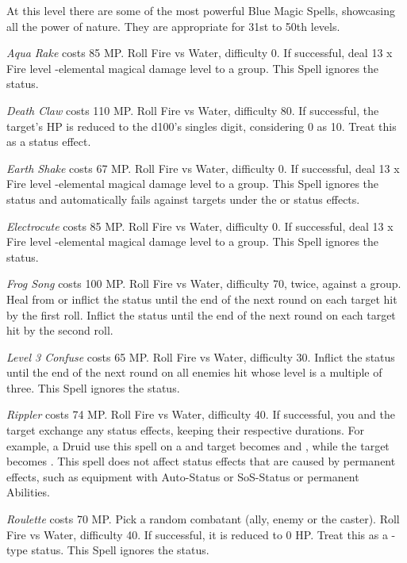 \begin{multicols}{2}
	At this level there are some of the most powerful Blue Magic Spells, showcasing all the power of nature. They are appropriate for 31st to 50th levels.

    \textit{Aqua Rake} costs 85 MP\@. Roll Fire vs Water, difficulty 0. If successful, deal 13 x Fire level -elemental magical damage level to a group. This Spell ignores the  status.

    \textit{Death Claw} costs 110 MP\@. Roll Fire vs Water, difficulty 80. If successful, the target's HP is reduced to the d100’s singles digit, considering 0 as 10. Treat this as a  status effect.
    
    \textit{Earth Shake} costs 67 MP\@. Roll Fire vs Water, difficulty 0. If successful, deal 13 x Fire level -elemental magical damage level to a group. This Spell ignores the  status and automatically fails against targets under the  or  status effects.
    
    \textit{Electrocute} costs 85 MP\@. Roll Fire vs Water, difficulty 0. If successful, deal 13 x Fire level -elemental magical damage level to a group. This Spell ignores the  status.
    
    \textit{Frog Song} costs 100 MP\@. Roll Fire vs Water, difficulty 70, twice, against a group. Heal from or inflict the  status until the end of the next round on each target hit by the first roll. Inflict the  status until the end of the next round on each target hit by the second roll.
    
    \textit{Level 3 Confuse} costs 65 MP\@. Roll Fire vs Water, difficulty 30. Inflict the  status until the end of the next round on all enemies hit whose level is a multiple of three. This Spell ignores the  status.
    
    \textit{Rippler} costs 74 MP\@. Roll Fire vs Water, difficulty 40. If successful, you and the target exchange any status effects, keeping their respective durations. For example, a  Druid use this spell on a  and  target becomes  and , while the target becomes . This spell does not affect status effects that are caused by permanent effects, such as equipment with Auto-Status or SoS-Status or permanent Abilities.
    
    \textit{Roulette} costs 70 MP\@. Pick a random combatant (ally, enemy or the caster). Roll Fire vs Water, difficulty 40. If successful, it is reduced to 0 HP\@. Treat this as a -type status. This Spell ignores the  status.
    

\end{multicols}
